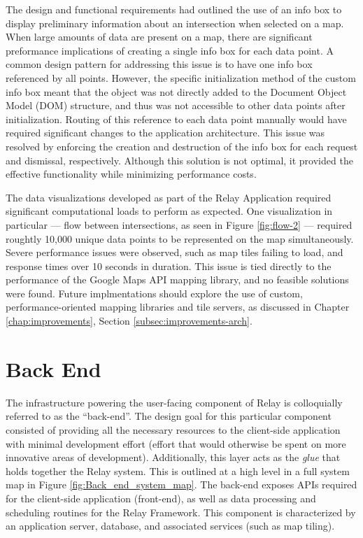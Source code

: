 \documentclass{report}
\begin{document}
The design and functional requirements had outlined the use of an info box to display preliminary information about an intersection when selected on a map. When large amounts of data are present on a map, there are significant preformance implications of creating a single info box for each data point. A common design pattern for addressing this issue is to have one info box referenced by all points. However, the specific initialization method of the custom info box meant that the object was not directly added to the Document Object Model (DOM) structure, and thus was not accessible to other data points after initialization. Routing of this reference to each data point manually would have required significant changes to the application architecture. This issue was resolved by enforcing the creation and destruction of the info box for each request and dismissal, respectively. Although this solution is not optimal, it provided the effective functionality while minimizing performance costs.

The data visualizations developed as part of the Relay Application required significant computational loads to perform as expected. One visualization in particular --- flow between intersections, as seen in Figure \ref{fig:flow-2} --- required roughtly 10,000 unique data points to be represented on the map simultaneously. Severe performance issues were observed, such as map tiles failing to load, and response times over 10 seconds in duration. This issue is tied directly to the performance of the Google Maps API mapping library, and no feasible solutions were found. Future implmentations should explore the use of custom, performance-oriented mapping libraries and tile servers, as discussed in Chapter \ref{chap:improvements}, Section \ref{subsec:improvements-arch}.


\section{Back End}
The infrastructure powering the user-facing component of Relay is colloquially referred to as the ``back-end''.
The design goal for this particular component consisted of providing all the necessary resources to the client-side application with minimal development effort (effort that would otherwise be spent on more innovative areas of development).
Additionally, this layer acts as the \emph{glue} that holds together the Relay system.
This is outlined at a high level in a full system map in Figure \ref{fig:Back_end_system_map}.
The back-end exposes APIs required for the client-side application (front-end), as well as data processing and scheduling routines for the Relay Framework.
This component is characterized by an application server, database, and associated services (such as map tiling).
\end{document}
